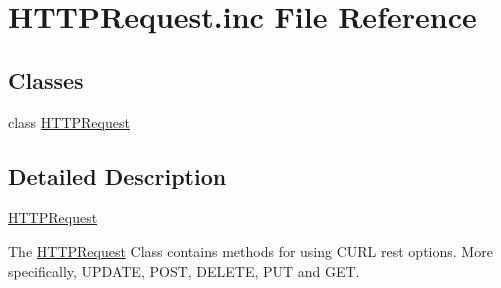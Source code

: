 \hypertarget{HTTPRequest_8inc}{}\section{H\+T\+T\+P\+Request.\+inc File Reference}
\label{HTTPRequest_8inc}
\subsection*{Classes}
\begin{DoxyCompactItemize}
\item 
class \hyperlink{classHTTPRequest}{H\+T\+T\+P\+Request}
\end{DoxyCompactItemize}


\subsection{Detailed Description}
\hyperlink{classHTTPRequest}{H\+T\+T\+P\+Request}

The \hyperlink{classHTTPRequest}{H\+T\+T\+P\+Request} Class contains methods for using C\+U\+RL rest options. More specifically, U\+P\+D\+A\+TE, P\+O\+ST, D\+E\+L\+E\+TE, P\+UT and G\+ET. 
